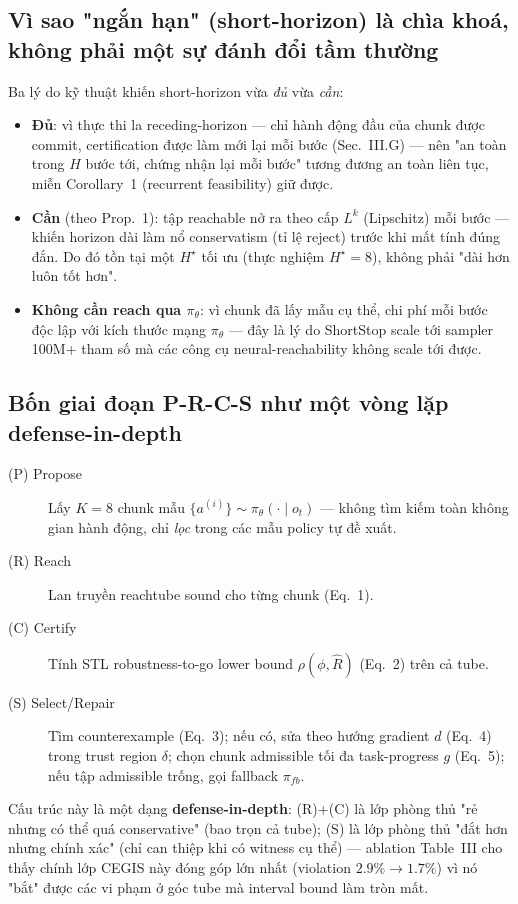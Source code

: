 \documentclass[a4paper,12pt]{article}
\begin{document}
\subsection{Vì sao "ngắn hạn" (short-horizon) là chìa khoá, không phải một sự đánh đổi tầm thường}
Ba lý do kỹ thuật khiến short-horizon vừa \emph{đủ} vừa \emph{cần}:
\begin{itemize}
  \item \textbf{Đủ}: vì thực thi la receding-horizon --- chỉ hành động đầu của chunk được commit, certification được làm mới lại mỗi bước (Sec.~III.G) --- nên "an toàn trong $H$ bước tới, chứng nhận lại mỗi bước" tương đương an toàn liên tục, miễn Corollary~1 (recurrent feasibility) giữ được.
  \item \textbf{Cần} (theo Prop.~1): tập reachable nở ra theo cấp $L^k$ (Lipschitz) mỗi bước --- khiến horizon dài làm nổ conservatism (tỉ lệ reject) trước khi mất tính đúng đắn. Do đó tồn tại một $H^\star$ tối ưu (thực nghiệm $H^\star=8$), không phải "dài hơn luôn tốt hơn".
  \item \textbf{Không cần reach qua $\pi_\theta$}: vì chunk đã lấy mẫu cụ thể, chi phí mỗi bước độc lập với kích thước mạng $\pi_\theta$ --- đây là lý do ShortStop scale tới sampler 100M+ tham số mà các công cụ neural-reachability không scale tới được.
\end{itemize}

\subsection{Bốn giai đoạn P-R-C-S như một vòng lặp defense-in-depth}
\begin{description}
  \item[(P) Propose] Lấy $K=8$ chunk mẫu $\{a^{(i)}\}\sim\pi_\theta(\cdot\mid o_t)$ --- không tìm kiếm toàn không gian hành động, chỉ \emph{lọc} trong các mẫu policy tự đề xuất.
  \item[(R) Reach] Lan truyền reachtube sound cho từng chunk (Eq.~1).
  \item[(C) Certify] Tính STL robustness-to-go lower bound $\rho(\phi,\hat R)$ (Eq.~2) trên cả tube.
  \item[(S) Select/Repair] Tìm counterexample (Eq.~3); nếu có, sửa theo hướng gradient $d$ (Eq.~4) trong trust region $\delta$; chọn chunk admissible tối đa task-progress $g$ (Eq.~5); nếu tập admissible trống, gọi fallback $\pi_{fb}$.
\end{description}
Cấu trúc này là một dạng \textbf{defense-in-depth}: (R)+(C) là lớp phòng thủ "rẻ nhưng có thể quá conservative" (bao trọn cả tube); (S) là lớp phòng thủ "đắt hơn nhưng chính xác" (chỉ can thiệp khi có witness cụ thể) --- ablation Table~III cho thấy chính lớp CEGIS này đóng góp lớn nhất (violation $2.9\%\to1.7\%$) vì nó "bắt" được các vi phạm ở góc tube mà interval bound làm tròn mất.
\end{document}

